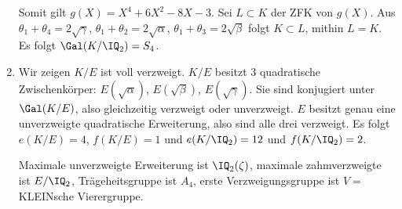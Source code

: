 \begin{Beispiel}
\begin{enumerate}[1)]
 Somit gilt $g(X)=X^4+6X^2-8X-3$. Sei $L\subset K$ der ZFK von $g(X)$. Aus $\theta_1+\theta_4=2\sqrt{\gamma}$, $\theta_1+\theta_2=2\sqrt{\alpha}$, $\theta_1+\theta_3=2\sqrt{\beta}$ folgt $K\subset L$, mithin $L=K$.
 Es folgt $\Gal(K/\IQ_2)=S_4$.
 
 \item Wir zeigen $K/E$ ist voll verzweigt. $K/E$ besitzt $3$ quadratische Zwischenkörper: $E(\sqrt\alpha)$, $E(\sqrt\beta)$, $E(\sqrt\gamma)$. Sie sind konjugiert unter $\Gal(K/E)$, also gleichzeitig verzweigt oder unverzweigt. $E$ besitzt genau eine unverzweigte quadratische Erweiterung, also sind alle drei verzweigt. Es folgt $e(K/E)=4$, $f(K/E)=1$ und $e(K/\IQ_2)=12$ und $f(K/\IQ_2)=2$.
 
 Maximale unverzweigte Erweiterung ist $\IQ_2(\zeta)$, maximale zahmverzweigte ist $E/\IQ_2$, Trägeheitsgruppe ist $A_4$, erste Verzweigungsgruppe ist $V = $ KLEINsche Vierergruppe.
 \end{enumerate}

\end{Beispiel}
